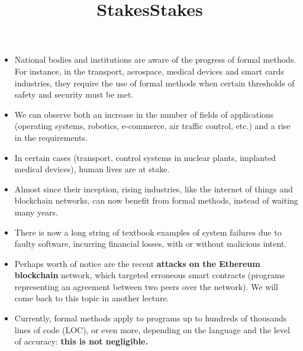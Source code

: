 \documentclass[wide]{slides}
\begin{document}
\begin{slide}
  \title{Stakes}

  \begin{itemize}

    \item National bodies and institutions are aware of the progress
      of formal methods. For instance, in the transport, aerospace,
      medical devices and smart cards industries, they require the use
      of formal methods when certain thresholds of safety and security
      must be met.

    \item We can observe both an increase in the number of fields of
      applications (operating systems, robotics, e-commerce, air
      traffic control, etc.) and a rise in the requirements.

    \item In certain cases (transport, control systems in nuclear
      plants, implanted medical devices), human lives are at stake.

    \item Almost since their inception, rising industries, like the
      internet of things and blockchain networks, can now benefit from
      formal methods, instead of waiting many years.

  \end{itemize}
\end{slide}

\begin{slide}
  \title{Stakes}

  \begin{itemize}

    \item There is now a long string of textbook examples of system
      failures due to faulty software, incurring financial losses,
      with or without malicious intent.

    \item Perhaps worth of notice are the recent \textbf{attacks on
      the Ethereum blockchain} network, which targeted erroneous smart
      contracts (programs representing an agreement between two peers
      over the network). We will come back to this topic in another
      lecture.

    \item Currently, formal methods apply to programs up to hundreds
      of thousands lines of code (LOC), or even more, depending on the
      language and the level of accuracy: \textbf{this is not
        negligible.}

  \end{itemize}

\end{slide}
\end{document}
